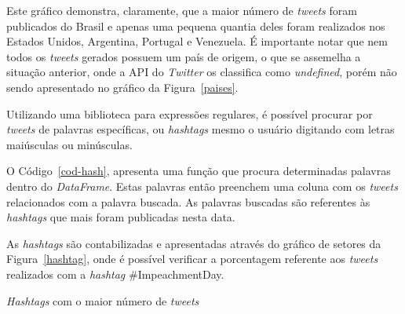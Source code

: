 Este gráfico demonstra, claramente, que a maior número de \textit{tweets} foram publicados do Brasil e apenas uma pequena quantia deles foram realizados nos Estados Unidos, Argentina, Portugal e Venezuela. É importante notar que nem todos os \textit{tweets} gerados possuem um país de origem, o que se assemelha a situação anterior, onde a API do \textit{Twitter} os classifica como \textit{undefined}, porém não sendo apresentado no gráfico da Figura~\ref{paises}.

Utilizando uma biblioteca para expressões regulares, é possível procurar por \textit{tweets} de palavras específicas, ou \textit{hashtags} mesmo o usuário digitando com letras maiúsculas ou minúsculas.

O Código~\ref{cod-hash}, apresenta uma função que procura determinadas palavras dentro do \textit{DataFrame}. Estas palavras então preenchem uma coluna com os \textit{tweets} relacionados com a palavra buscada. As palavras buscadas são referentes às \textit{hashtags} que mais foram publicadas nesta data.



As \textit{hashtags} são contabilizadas e apresentadas através do gráfico de setores da Figura~\ref{hashtag}, onde é possível verificar a porcentagem referente aos \textit{tweets} realizados com a \textit{hashtag} \#ImpeachmentDay. 

\begin{grafico}[h]
	\centering
	\caption{\textit{Hashtags} com o maior número de \textit{tweets}}
	\vspace{-0.3cm}
	\label{hashtag}
\end{grafico}


